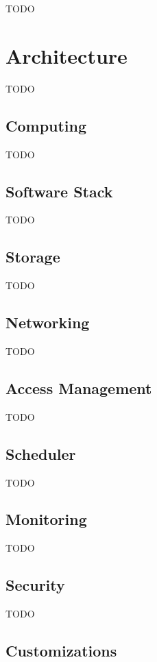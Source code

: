 TODO

\section{Architecture}

TODO

\subsection{Computing}

TODO

\subsection{Software Stack}

TODO

\subsection{Storage}

TODO

\subsection{Networking}

TODO

\subsection{Access Management}

TODO

\subsection{Scheduler}

TODO

\subsection{Monitoring}

TODO

\subsection{Security}

TODO

\subsection{Customizations}

